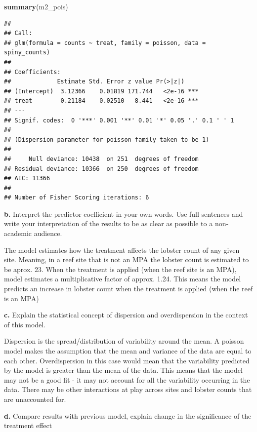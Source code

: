 \documentclass[
]{article}
\newenvironment{Shaded}{\begin{snugshade}}{\end{snugshade}}
\newcommand{\FunctionTok}[1]{\textcolor[rgb]{0.13,0.29,0.53}{\textbf{#1}}}
\newcommand{\NormalTok}[1]{#1}
\begin{document}
\begin{Shaded}
\begin{Highlighting}[]
\FunctionTok{summary}\NormalTok{(m2\_pois)}
\end{Highlighting}
\end{Shaded}

\begin{verbatim}
## 
## Call:
## glm(formula = counts ~ treat, family = poisson, data = spiny_counts)
## 
## Coefficients:
##             Estimate Std. Error z value Pr(>|z|)    
## (Intercept)  3.12366    0.01819 171.744   <2e-16 ***
## treat        0.21184    0.02510   8.441   <2e-16 ***
## ---
## Signif. codes:  0 '***' 0.001 '**' 0.01 '*' 0.05 '.' 0.1 ' ' 1
## 
## (Dispersion parameter for poisson family taken to be 1)
## 
##     Null deviance: 10438  on 251  degrees of freedom
## Residual deviance: 10366  on 250  degrees of freedom
## AIC: 11366
## 
## Number of Fisher Scoring iterations: 6
\end{verbatim}

\textbf{b.} Interpret the predictor coefficient in your own words. Use
full sentences and write your interpretation of the results to be as
clear as possible to a non-academic audience.

The model estimates how the treatment affects the lobster count of any
given site. Meaning, in a reef site that is not an MPA the lobster count
is estimated to be aprox. 23. When the treatment is applied (when the
reef site is an MPA), model estimates a multiplicative factor of approx.
1.24. This means the model predicts an increase in lobster count when
the treatment is applied (when the reef is an MPA)

\textbf{c.} Explain the statistical concept of dispersion and
overdispersion in the context of this model.

Dispersion is the spread/distribution of variability around the mean. A
poisson model makes the assumption that the mean and variance of the
data are equal to each other. Overdispersion in this case would mean
that the variability predicted by the model is greater than the mean of
the data. This means that the model may not be a good fit - it may not
account for all the variability occurring in the data. There may be
other interactions at play across sites and lobster counts that are
unaccounted for.

\textbf{d.} Compare results with previous model, explain change in the
significance of the treatment effect
\end{document}
